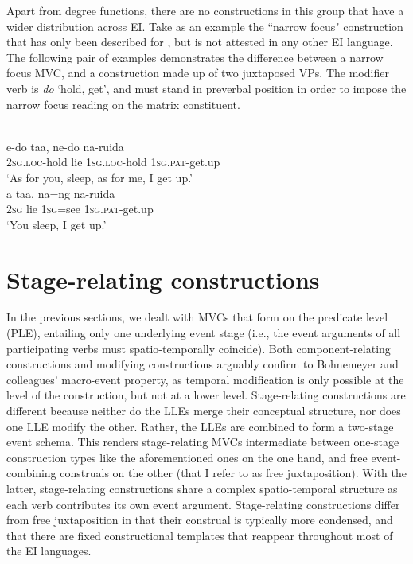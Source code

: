 Apart from degree functions, there are no constructions in this group that have a wider distribution across EI. Take as an example the ``narrow focus" construction that has only been described for  \citep[385f.]{kratochvil2007grammar}, but is not attested in any other EI language. The following pair of examples demonstrates the difference between a narrow focus MVC, and a construction made up of two juxtaposed VPs. The modifier verb is \textit{do} `hold, get', and must stand in preverbal position in order to impose the narrow focus reading on the matrix constituent.

\ea \label{Abui_99}
\\
\ea
\gll e-do taa, ne-do na-ruida \\
2\textsc{sg}.\textsc{loc}-hold lie 1\textsc{sg}.\textsc{loc}-hold 1\textsc{sg}.\textsc{pat}-get.up \\
\glft `As for you, sleep, as for me, I get up.’ \\ 
\ex
\gll a taa, na=ng na-ruida \\ 
2\textsc{sg} lie 1\textsc{sg}=see 1\textsc{sg}.\textsc{pat}-get.up \\
\glft `You sleep, I get up.’\\ 
\z
\z

\section{Stage-relating constructions}\label{sec:stage-relating}

In the previous sections, we dealt with MVCs that form on the predicate level (PLE), entailing only one underlying event stage (i.e., the event arguments of all participating verbs must spatio-temporally coincide). Both component-relating constructions and modifying constructions arguably confirm to Bohnemeyer and colleagues' macro-event property, as temporal modification is only possible at the level of the construction, but not at a lower level. Stage-relating constructions are different because neither do the LLEs merge their conceptual structure, nor does one LLE modify the other. Rather, the LLEs are combined to form a two-stage event schema. This renders stage-relating MVCs intermediate between one-stage construction types like the aforementioned ones on the one hand, and free event-combining construals on the other (that I refer to as free juxtaposition). With the latter, stage-relating constructions share a complex spatio-temporal structure as each verb contributes its own event argument. Stage-relating constructions differ from free juxtaposition in that their construal is typically more condensed, and that there are fixed constructional templates that reappear throughout most of the EI languages.

